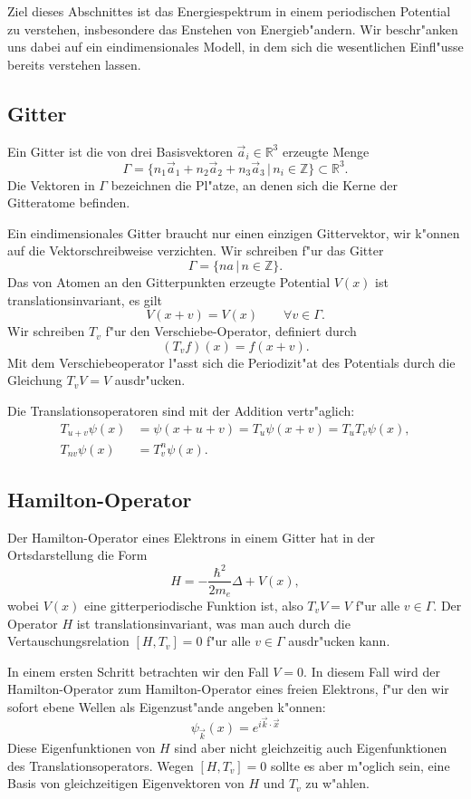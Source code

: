 Ziel dieses Abschnittes ist das Energiespektrum in einem periodischen
Potential zu verstehen, insbesondere das Enstehen von Energieb"andern.
Wir beschr"anken uns dabei auf ein eindimensionales Modell, in dem sich die
wesentlichen Einfl"usse bereits verstehen lassen.

\subsection{Gitter}
Ein Gitter ist die von drei Basisvektoren $\vec a_i\in\mathbb R^3$
erzeugte Menge
\[
\Gamma
=
\{
n_1\vec a_1+
n_2\vec a_2+
n_3\vec a_3
\,|\,
n_i\in \mathbb Z
\}\subset{\mathbb R}^3.
\]
Die Vektoren in $\Gamma$ bezeichnen die Pl"atze, an denen sich die
Kerne der Gitteratome befinden. 

Ein eindimensionales Gitter braucht nur einen einzigen Gittervektor,
wir k"onnen auf die Vektorschreibweise verzichten.
Wir schreiben f"ur das Gitter
\[
\Gamma=\{ na\,|\,n\in\mathbb Z\}.
\]
Das von Atomen an den Gitterpunkten erzeugte Potential $V(x)$
ist translationsinvariant, es gilt
\[
V(x+v)=V(x)\qquad\forall v\in\Gamma.
\]
Wir schreiben $T_v$ f"ur den Verschiebe-Operator, definiert durch
\[
(T_vf)(x)=f(x+v).
\]
Mit dem Verschiebeoperator l"asst sich die Periodizit"at des Potentials
durch die Gleichung $T_vV=V$ ausdr"ucken.

Die Translationsoperatoren sind mit der Addition vertr"aglich:
\begin{align*}
T_{u+v}\psi(x)&=\psi(x+u+v)=T_u\psi(x+v)=T_uT_v\psi(x),\\
T_{nv}\psi(x)&=T_v^n\psi(x).
\end{align*}

\subsection{Hamilton-Operator}
Der Hamilton-Operator eines Elektrons in einem Gitter hat in der Ortsdarstellung
die Form
\[
H=-\frac{\hbar^2}{2m_e}\Delta + V(x),
\]
wobei $V(x)$ eine gitterperiodische Funktion ist, also $T_vV=V$ f"ur alle
$v\in\Gamma$.
Der Operator $H$ ist translationsinvariant, was man auch durch
die Vertauschungsrelation $[H,T_v]=0$ f"ur alle $v\in\Gamma$
ausdr"ucken kann.

In einem ersten Schritt betrachten wir den Fall $V=0$.
In diesem Fall wird der Hamilton-Operator zum Hamilton-Operator eines
freien Elektrons, f"ur den wir sofort ebene Wellen als Eigenzust"ande
angeben k"onnen:
\begin{equation}
\psi_{\vec k}(x)=e^{i\vec k\cdot \vec x}
\label{skript:ebenewelle}
\end{equation}
Diese Eigenfunktionen von $H$ sind aber nicht gleichzeitig auch
Eigenfunktionen des Translationsoperators. Wegen $[H,T_v]=0$
sollte es aber m"oglich sein, eine Basis von gleichzeitigen
Eigenvektoren von $H$ und $T_v$ zu w"ahlen.

